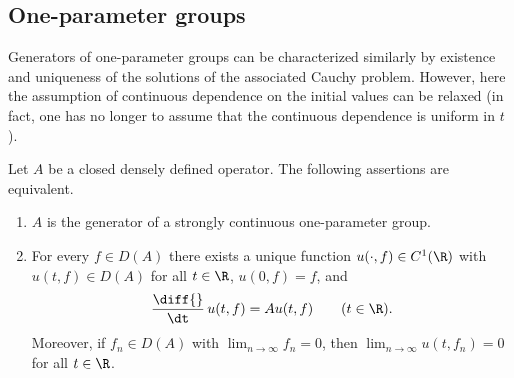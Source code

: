 \subsection{One-parameter groups} \label{subsec:a2-1.se2}%
%
Generators of one-parameter groups can be characterized similarly by existence and uniqueness of the solutions of the associated Cauchy problem.
However, here the assumption of continuous dependence on the initial values can be relaxed (in fact, one has no longer to assume that the continuous dependence is uniform in $t$).
\begin{theorem}\label{thm:a2-1.6}
Let $A$ be a closed densely defined operator.
The following assertions are equivalent.
\begin{enumerate}[\upshape (a)]
\item \label{thm:a2-1.6.1}
$A$ is the generator of a strongly continuous one-parameter group.
\item \label{thm:a2-1.6.2}
For every $f \in D(A)$ there exists a unique function
$u(\cdot,f) \in C^{1}(\R)$ with $u(t,f) \in D(A)$ for all $t \in \R$,
$u(0,f) = f$, and
\[
    \frac{\diff{}}{\dt}\,u(t,f) = Au(t,f) \qquad (t \in \R).
\]
Moreover, if\/ $f_n \in D(A)$ with $\lim_{n \to \infty} f_n = 0$,
then $\lim_{n \to \infty} u(t,f_n) = 0$ for all $t \in \R$.
\end{enumerate}
\end{theorem}
